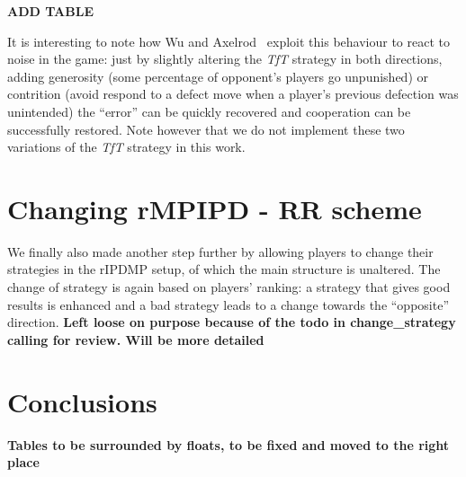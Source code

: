 \documentclass[journal,a4paper,10pt,twoside]{IEEEtran} %
\begin{document}
\textbf{ADD TABLE}

It is interesting to note how Wu and Axelrod~\cite{IPDnoise} exploit this behaviour to react to noise in the game: just by slightly altering the \textit{TfT} strategy in both directions, adding generosity (some percentage of opponent's players go unpunished) or contrition (avoid respond to a defect move when a player's previous defection was unintended) the ``error'' can be quickly recovered and cooperation can be successfully restored. Note however that we do not implement these two variations of the \textit{TfT} strategy in this work.

\section{Changing rMPIPD - RR scheme} \label{s:crIPDMP}
We finally also made another step further by allowing players to change their strategies in the rIPDMP setup, of which the main structure is unaltered. The change of strategy is again based on players' ranking: a strategy that gives good results is enhanced and a bad strategy leads to a change towards the ``opposite'' direction.
\textbf{Left loose on purpose because of the todo in change_strategy calling for review. Will be more detailed}

\section{Conclusions} \label{s:conc}

\textbf{Tables to be surrounded by floats, to be fixed and moved to the right place}
\end{document}

